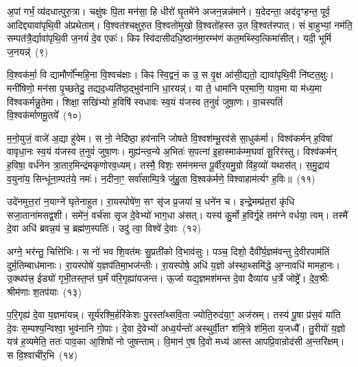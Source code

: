 अ॒पां गर्भं॒ व्य॑दधात्पुरु॒त्रा। चक्षु॑षः पि॒ता मन॑सा॒ हि धीरो॑ घृ॒तमे॑ने अजन॒न्नन्न॑माने। य॒देदन्ता॒ अद॑दृꣳहन्त॒ पूर्व॒ आदिद्द्यावा॑पृथि॒वी अ॑प्रथेताम्। वि॒श्वत॑श्चक्षुरु॒त वि॒श्वतो॑मुखो वि॒श्वतो॑हस्त उ॒त वि॒श्वत॑स्पात्। सं बा॒हुभ्यां॒ नम॑ति॒ सम्पत॑त्रै॒र्द्यावा॑पृथि॒वी ज॒नयं॑ दे॒व एकः॑। किꣴ स्वि॑दासीदधि॒ष्ठान॑मा॒रम्भ॑णं कत॒मथ्स्वि॒त्किमा॑सीत्। यदी॒ भूमिं॑ ज॒नयन्न्॑~(९)

वि॒श्वक॑र्मा॒ वि द्यामौर्णो᳚न्महि॒ना वि॒श्वच॑क्षाः। किꣴ स्वि॒द्वनं॒ क उ॒ स वृ॒क्ष आ॑सी॒द्यतो॒ द्यावा॑पृथि॒वी नि॑ष्टत॒क्षुः। मनी॑षिणो॒ मन॑सा पृ॒च्छतेदु॒ तद्यद॒ध्यति॑ष्ठ॒द्भुव॑नानि धा॒रयन्न्॑। या ते॒ धामा॑नि पर॒माणि॒ याव॒मा या म॑ध्य॒मा वि॑श्वकर्मन्नु॒तेमा। शिक्षा॒ सखि॑भ्यो ह॒विषि॑ स्वधावः स्व॒यं य॑जस्व त॒नुवं॑ जुषा॒णः। वा॒चस्पतिं॑ वि॒श्वक॑र्माणमू॒तये᳚~(१०)

म॒नो॒युजं॒ वाजे॑ अ॒द्या हु॑वेम। स नो॒ नेदि॑ष्ठा॒ हव॑नानि जोषते वि॒श्वश॑म्भू॒रव॑से सा॒धुक॑र्मा। विश्व॑कर्मन् ह॒विषा॑ वावृधा॒नः स्व॒यं य॑जस्व त॒नुवं॑ जुषा॒णः। मुह्य॑न्त्व॒न्ये अ॒भितः॑ स॒पत्ना॑ इ॒हास्माक॑म्म॒घवा॑ सू॒रिर॑स्तु। विश्व॑कर्मन् ह॒विषा॒ वर्ध॑नेन त्रा॒तार॒मिन्द्र॑मकृणोरव॒ध्यम्। तस्मै॒ विशः॒ सम॑नमन्त पू॒र्वीर॒यमु॒ग्रो वि॑ह॒व्यो॑ यथास॑त्। स॒मु॒द्राय॑ व॒युना॑य॒ सिन्धू॑ना॒म्पत॑ये॒ नमः॑। न॒दीना॒ꣳ॒ सर्वा॑साम्पि॒त्रे जु॑हु॒ता वि॒श्वक॑र्मणे॒ विश्वाहाम॑र्त्यꣳ ह॒विः॥~(११)

{\anuvakamend[{ज॒जानै॒नौष॑धीनां॒ भूमिं॑ ज॒नय॑न्नू॒तये॒ नमो॒ नव॑ च}]}%

उदे॑नमुत्त॒रां न॒याग्ने॑ घृतेनाहुत। रा॒यस्पोषे॑ण॒ सꣳ सृ॑ज प्र॒जया॑ च॒ धने॑न च। इन्द्रे॒मम्प्र॑त॒रां कृ॑धि सजा॒ताना॑मसद्व॒शी। समे॑नं॒ वर्च॑सा सृज दे॒वेभ्यो॑ भाग॒धा अ॑सत्। यस्य॑ कु॒र्मो ह॒विर्गृ॒हे तम॑ग्ने वर्धया॒ त्वम्। तस्मै॑ दे॒वा अधि॑ ब्रवन्न॒यं च॒ ब्रह्म॑ण॒स्पतिः॑। उदु॑ त्वा॒ विश्वे॑ दे॒वाः~(१२)

अग्ने॒ भर॑न्तु॒ चित्ति॑भिः। स नो॑ भव शि॒वत॑मः सु॒प्रती॑को वि॒भाव॑सुः। पञ्च॒ दिशो॒ दैवी᳚र्य॒ज्ञम॑वन्तु दे॒वीरपाम॑तिं दुर्म॒तिम्बाध॑मानाः। रा॒यस्पोषे॑ य॒ज्ञप॑तिमा॒भज॑न्तीः। रा॒यस्पोषे॒ अधि॑ य॒ज्ञो अ॑स्था॒थ्समि॑द्धे अ॒ग्नावधि॑ मामहा॒नः। उ॒क्थप॑त्त्र॒ ईड्यो॑ गृभी॒तस्त॒प्तं घ॒र्मं प॑रि॒गृह्या॑यजन्त। ऊ॒र्जा यद्य॒ज्ञमश॑मन्त दे॒वा दैव्या॑य ध॒र्त्रे जोष्ट्रे᳚। दे॒व॒श्रीः श्रीम॑णाः श॒तप॑याः~(१३)

प॒रि॒गृह्य॑ दे॒वा य॒ज्ञमा॑यन्न्। सूर्य॑रश्मि॒र्\mbox{}हरि॑केशः पु॒रस्ता᳚थ्सवि॒ता ज्योति॒रुद॑या॒ꣳ॒ अज॑स्रम्। तस्य॑ पू॒षा प्र॑स॒वं या॑ति दे॒वः स॒म्पश्य॒न्विश्वा॒ भुव॑नानि गो॒पाः। दे॒वा दे॒वेभ्यो॑ अध्व॒र्यन्तो॑ अस्थुर्वी॒तꣳ श॑मि॒त्रे श॑मि॒ता य॒जध्यै᳚। तु॒रीयो॑ य॒ज्ञो यत्र॑ ह॒व्यमेति॒ ततः॑ पाव॒का आ॒शिषो॑ नो जुषन्ताम्। वि॒मान॑ ए॒ष दि॒वो मध्य॑ आस्त आपप्रि॒वान्रोद॑सी अ॒न्तरि॑क्षम्। स वि॒श्वाची॑र॒भि~(१४)

